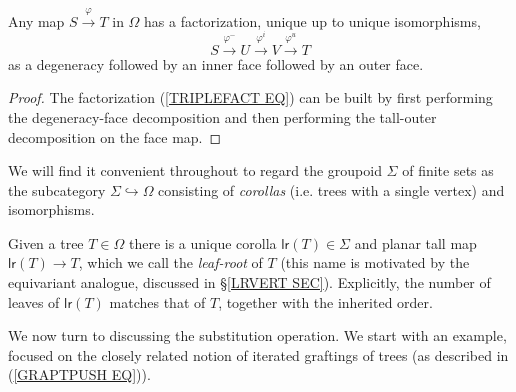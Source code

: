 \documentclass[a4paper,10pt]{article}%
\begin{document}
\begin{corollary}
	Any map $S \xrightarrow{\varphi} T$ in $\Omega$ has a factorization, unique up to unique isomorphisms,
	\begin{equation}\label{TRIPLEFACT EQ}
		S \xrightarrow{\varphi^-} U \xrightarrow{\varphi^i} V \xrightarrow{\varphi^u} T
	\end{equation}
	as a degeneracy followed by an inner face followed by an outer face.
\end{corollary}
	
\begin{proof}
	The factorization (\ref{TRIPLEFACT EQ}) can be built by first performing the degeneracy-\-face decomposition and then performing the tall-outer decomposition on the face map.
\end{proof}


We will find it convenient  throughout to regard the 
groupoid $\Sigma$ of finite sets 
as the subcategory 
$\Sigma \hookrightarrow \Omega$
consisting of \textit{corollas}
(i.e. trees with a single vertex)
and isomorphisms.


\begin{notation}\label{UNIQCOR NOT}
	Given a tree $T \in \Omega$ there is a unique corolla $\mathsf{lr}(T) \in \Sigma$ and planar tall map 
	$\mathsf{lr}(T) \to T$, which we call the 
	\textit{leaf-root} of $T$ (this name is motivated by the equivariant analogue, discussed in \S \ref{LRVERT SEC}).
	Explicitly, the number of leaves of $\mathsf{lr}(T)$ matches that of $T$, together with the inherited order. 
\end{notation}


We now turn to discussing the substitution operation. We start with an example, focused on the closely related notion of 
 iterated graftings of trees (as described in (\ref{GRAPTPUSH EQ})).
\end{document}
